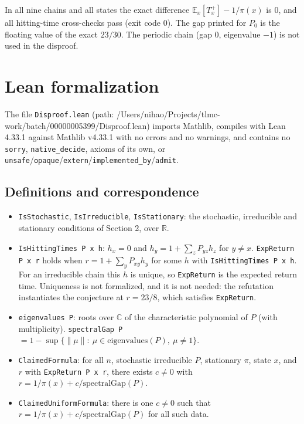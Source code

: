 \documentclass[11pt,a4paper]{article}
\begin{document}
In all nine chains and all states the exact difference $\mathbb{E}_x[T_x^+]-1/\pi(x)$ is $0$, and all hitting-time cross-checks pass (exit code 0). The gap printed for $P_0$ is the floating value of the exact $23/30$. The periodic chain (gap $0$, eigenvalue $-1$) is not used in the disproof.

\section{Lean formalization}

The file \texttt{Disproof.lean} (path: /Users/nihao/Projects/tlmc-work/batch/00000005399/Disproof.lean) imports Mathlib, compiles with Lean 4.33.1 against Mathlib v4.33.1 with no errors and no warnings, and contains no \texttt{sorry}, \texttt{native\_decide}, axioms of its own, or \texttt{unsafe}/\texttt{opaque}/\texttt{extern}/\texttt{implemented\_by}/\texttt{admit}.

\subsection*{Definitions and correspondence}

\begin{itemize}
\item \texttt{IsStochastic}, \texttt{IsIrreducible}, \texttt{IsStationary}: the stochastic, irreducible and stationary conditions of Section 2, over $\mathbb{R}$.
\item \texttt{IsHittingTimes P x h}: $h_x=0$ and $h_y=1+\sum_z P_{yz}h_z$ for $y\neq x$. \texttt{ExpReturn P x r} holds when $r=1+\sum_y P_{xy}h_y$ for some $h$ with \texttt{IsHittingTimes P x h}. For an irreducible chain this $h$ is unique, so \texttt{ExpReturn} is the expected return time. Uniqueness is not formalized, and it is not needed: the refutation instantiates the conjecture at $r=23/8$, which satisfies \texttt{ExpReturn}.
\item \texttt{eigenvalues P}: roots over $\mathbb{C}$ of the characteristic polynomial of $P$ (with multiplicity). \texttt{spectralGap P} $=1-\sup\{\|\mu\|:\ \mu\in\mathrm{eigenvalues}(P),\ \mu\neq 1\}$.
\item \texttt{ClaimedFormula}: for all $n$, stochastic irreducible $P$, stationary $\pi$, state $x$, and $r$ with \texttt{ExpReturn P x r}, there exists $c\neq 0$ with $r=1/\pi(x)+c/\mathrm{spectralGap}(P)$.
\item \texttt{ClaimedUniformFormula}: there is one $c\neq 0$ such that $r=1/\pi(x)+c/\mathrm{spectralGap}(P)$ for all such data.
\end{itemize}
\end{document}
